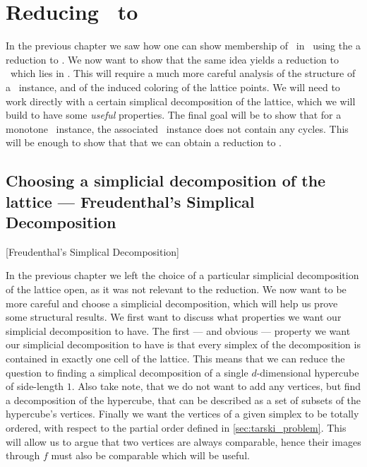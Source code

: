 \setchapterpreamble[u]{\margintoc}
\chapter{Reducing \Tarski\ to \EOPL}

In the previous chapter we saw how one can show membership of \Tarski\ in \PPAD\ using the a reduction to \Sperner. We now want to show that the same idea yields a reduction to \EndOfPotentialLine\ which lies in \EOPL. This will require a much more careful analysis of the structure of a \Tarski\ instance, and of the induced coloring of the lattice points. We will need to work directly with a certain simplical decomposition of the lattice, which we will build to have some \textit{useful} properties. The final goal will be to show that for a monotone \Tarski\ instance, the associated \EndOfLine\ instance does not contain any cycles. This will be enough to show that that we can obtain a reduction to \EndOfPotentialLine.

\section{Choosing a simplicial decomposition of the lattice --- Freudenthal's Simplical Decomposition}[Freudenthal's Simplical Decomposition]
\label{sec:freudenthal_simplicial_decomposition}

In the previous chapter we left the choice of a particular simplicial decomposition of the lattice open, as it was not relevant to the reduction. We now want to be more careful and choose a simplicial decomposition, which will help us prove some structural results. We first want to discuss what properties we want our simplicial decomposition to have. The first --- and obvious --- property we want our simplicial decomposition to have is that every simplex of the decomposition is contained in exactly one cell of the lattice. This means that we can reduce the question to finding a simplical decomposition of a single $d$-dimensional hypercube of side-length $1$. Also take note, that we do not want to add any vertices, but find a decomposition of the hypercube, that can be described as a set of subsets of the hypercube's vertices.	Finally we want the vertices of a given simplex to be totally ordered, with respect to the partial order defined in \cref{sec:tarski_problem}. This will allow us to argue that two vertices are always comparable, hence their images through $f$ must also be comparable which will be useful.


